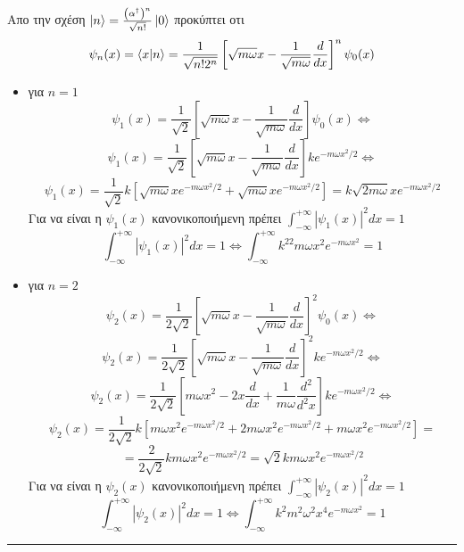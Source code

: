 \documentclass[12pt]{article}
\begin{document}
\section*{{}}
Απο την σχέση $ \ket{n} = \frac{\left(\alpha^\dag\right)^n}{\sqrt{n!}}\ket{0}$ προκύπτει οτι 
$$ \psi_n(x) = \braket{x|n} =\frac{1}{\sqrt{n!2^n}}\left[\sqrt{m\omega}x - \frac{1}{\sqrt{m \omega}}\frac{d}{dx} \right]^n\psi_0(x)$$
\begin{itemize}
    \item για $n=1$ 
        $$\psi_1(x) = \frac{1}{\sqrt{2}}\left[\sqrt{m\omega}x - \frac{1}{\sqrt{m \omega}}\frac{d}{dx} \right]\psi_0(x)\Leftrightarrow$$
        $$\psi_1(x) =\frac{1}{\sqrt{2}}\left[\sqrt{m\omega}x - \frac{1}{\sqrt{m \omega}}\frac{d}{dx} \right] ke^{-m\omega x^2/2}\Leftrightarrow$$
        $$\psi_1(x) =\frac{1}{\sqrt{2}}k\left[\sqrt{m\omega}xe^{-m\omega x^2/2} + \sqrt{m \omega}xe^{-m\omega x^2/2} \right]  = k\sqrt{2m\omega}xe^{-m\omega x^2/2}$$
        Για να είναι η $\psi_1(x)$ κανονικοποιήμενη πρέπει $\int_{-\infty}^{+\infty}|\psi_1(x)|^2dx=1$
        $$\int_{-\infty}^{+\infty}|\psi_1(x)|^2dx=1 \Leftrightarrow \int_{-\infty}^{+\infty} k^22m\omega x^2e^{-m\omega x^2}=1$$
    \item για $n=2$ 
        $$\psi_2(x) = \frac{1}{2\sqrt{2}}\left[\sqrt{m\omega}x - \frac{1}{\sqrt{m \omega}}\frac{d}{dx} \right]^2\psi_0(x)\Leftrightarrow$$
        $$\psi_2(x) =\frac{1}{2\sqrt{2}}\left[\sqrt{m\omega}x - \frac{1}{\sqrt{m \omega}}\frac{d}{dx} \right] ^2ke^{-m\omega x^2/2}\Leftrightarrow$$
        $$\psi_2(x) =\frac{1}{2\sqrt{2}}\left[m\omega x^2 -2x\frac{d}{dx}+ \frac{1}{m \omega}\frac{d^2}{d^2x} \right] ke^{-m\omega x^2/2}\Leftrightarrow$$
        $$\psi_2(x) =\frac{1}{2\sqrt{2}}k\left[m\omega x^2e^{-m\omega x^2/2} + 2m\omega x^2e^{-m\omega x^2/2}+m\omega x^2e^{-m\omega x^2/2} \right] =$$
        $$= \frac{2}{2\sqrt{2}}km\omega x^2e^{-m\omega x^2/2} = \sqrt{2}km\omega x^2e^{-m\omega x^2/2}$$
        Για να είναι η $\psi_2(x)$ κανονικοποιήμενη πρέπει $\int_{-\infty}^{+\infty}|\psi_2(x)|^2dx=1$
        $$\int_{-\infty}^{+\infty}|\psi_2(x)|^2dx=1 \Leftrightarrow \int_{-\infty}^{+\infty} k^2m^2\omega^2 x^4e^{-m\omega x^2}=1$$    
    \end{itemize}
    \rule{\textwidth}{.5pt}
\end{document}
